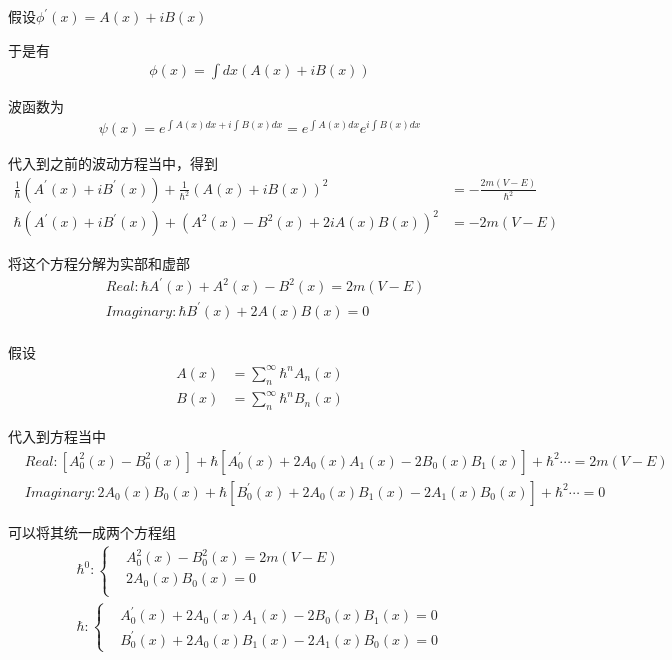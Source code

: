 \documentclass{article}
\begin{document}
假设$\phi^\prime(x)=A(x)+iB(x)$

于是有
\begin{align*}
	\phi(x)=\int dx \left(A(x)+iB(x)\right)
\end{align*}

波函数为
\begin{align*}
	\psi(x)= e^{\displaystyle\int A(x)dx+i\int B(x)dx}=e^{\displaystyle\int A(x)dx}e^{\displaystyle i\int B(x)dx}
\end{align*}

代入到之前的波动方程当中，得到
\begin{align*}
	\frac{1}{\hbar}\left(A^\prime(x)+iB^\prime(x)\right)+\frac{1}{\hbar^2}\left(A(x)+iB(x)\right)^2 & =-\frac{2m(V-E)}{\hbar^2} \\
	\hbar\left(A^\prime(x)+iB^\prime(x)\right)+\left(A^2(x)-B^2(x)+2iA(x)B(x)\right)^2              & =-2m(V-E)
\end{align*}

将这个方程分解为实部和虚部
\begin{align*}
	 & Real:\hbar A^\prime(x)+A^2(x)-B^2(x)=2m(V-E) \\
	 & Imaginary:\hbar B^\prime(x)+2A(x)B(x)=0      \\
\end{align*}

假设
\begin{align*}
	A(x) & =\sum_n^\infty \hbar^n A_n(x) \\
	B(x) & =\sum_n^\infty \hbar^n B_n(x)
\end{align*}

代入到方程当中
\begin{align*}
	 & Real:\left[A^2_0(x)-B^2_0(x)\right]+\hbar\left[A^\prime_0(x)+2A_0(x)A_1(x)-2B_0(x)B_1(x)\right]+\hbar^2\cdots=2m(V-E) \\
	 & Imaginary:2A_0(x)B_0(x)+\hbar\left[B^\prime_0(x)+2A_0(x)B_1(x)-2A_1(x)B_0(x)\right]+\hbar^2\cdots=0
\end{align*}

可以将其统一成两个方程组
\begin{align*}
	\hbar^0:
	\begin{cases}
		 & A^2_0(x)-B^2_0(x)=2m(V-E) \\
		 & 2A_0(x)B_0(x)=0           \\
	\end{cases} \\
	\hbar:
	\begin{cases}
		 & A^\prime_0(x)+2A_0(x)A_1(x)-2B_0(x)B_1(x)=0 \\
		 & B^\prime_0(x)+2A_0(x)B_1(x)-2A_1(x)B_0(x)=0
	\end{cases}
\end{align*}
\end{document}
